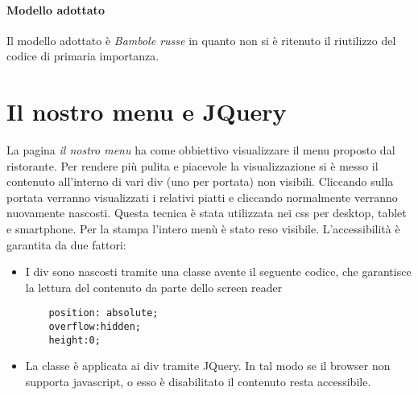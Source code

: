 \paragraph{Modello adottato}
Il modello adottato è \emph{Bambole russe} in quanto non si è ritenuto il riutilizzo del codice di primaria importanza.

\section{Il nostro menu e JQuery}
La pagina \emph{il nostro menu} ha come obbiettivo visualizzare il menu proposto dal ristorante. 
Per rendere più pulita e piacevole la visualizzazione si è messo il contenuto all'interno di vari div (uno per portata) non visibili.
Cliccando sulla portata verranno visualizzati i relativi piatti e cliccando normalmente verranno nuovamente nascosti.
Questa tecnica è stata utilizzata nei css per desktop, tablet e smartphone. 
Per la stampa l'intero menù è stato reso visibile.
L'accessibilità è garantita da due fattori:
\begin{itemize}
\item I div sono nascosti tramite una classe avente il seguente codice, che garantisce la lettura del contenuto da parte dello screen reader
\begin{lstlisting}
	position: absolute; 
	overflow:hidden; 
	height:0;
\end{lstlisting}
\item La classe è applicata ai div tramite JQuery. In tal modo se il browser non supporta javascript, o esso è disabilitato il contenuto resta accessibile.
\end{itemize}